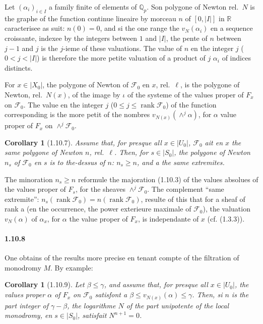 \documentclass[12pt,a4paper]{article}
\theoremstyle{plain}
\newtheorem{corollary}[theorem]{Corollary}
\theoremstyle{definition}
\theoremstyle{remark}
\DeclareMathOperator{\rank}{rank}
\newcommand{\QQ}{{\mathbb{Q}}}
\newcommand{\RR}{{\mathbb{R}}}
\begin{document}
Let $(\alpha_i)_{i \in I}$ a family finite of elements of $\QQ_p$. Son polygone of Newton rel.~$N$ is the graphe of the function continue lineaire by morceau $n$ of $[0, |I|]$ in $\RR$ caracterisee as suit: $n(0) = 0$, and si the one range the $v_N(\alpha_i)$ en a sequence croissante, indexee by the integers between $1$ and $|I|$, the pente of $n$ between $j-1$ and $j$ is the $j$-ieme of these valuations. The value of $n$ en the integer $j$ ($0 < j < |I|$) is therefore the more petite valuation of a product of $j$ $\alpha_i$ of indices distincts.

For $x \in |X_0|$, the polygone of Newton of $\mathscr{F}_0$ en $x$, rel.~$\ell$, is the polygone of Newton, rel.~$N(x)$, of the image by $\iota$ of the systeme of the values proper of $F_x$ on $\mathscr{F}_0$. The value en the integer $j$ ($0 \leq j \leq \rank \mathscr{F}_0$) of the function corresponding is the more petit of the nombres $v_{N(x)}(\wedge^j \alpha)$, for $\alpha$ value proper of $F_x$ on $\wedge^j \mathscr{F}_0$.


\begin{corollary}[1.10.7]
Assume that, for presque all $x \in |U_0|$, $\mathscr{F}_0$ ait en $x$ the same polygone of Newton $n$, rel.~$\ell$. Then, for $s \in |S_0|$, the polygone of Newton $n_s$ of $\mathscr{F}_0$ en $s$ is to the-dessus of $n$: $n_s \geq n$, and a the same extremites.
\end{corollary}

The minoration $n_s \geq n$ reformule the majoration (1.10.3) of the values absolues of the values proper of $F_s$, for the sheaves $\wedge^j \mathscr{F}_0$. The complement ``same extremite'': $n_s(\rank \mathscr{F}_0) = n(\rank \mathscr{F}_0)$, resulte of this that for a sheaf of rank a (en the occurrence, the power exterieure maximale of $\mathscr{F}_0$), the valuation $v_N(\alpha)$ of $\alpha_x$, for $\alpha$ the value proper of $F_x$, is independante of $x$ (cf. (1.3.3)).

\paragraph{1.10.8}
One obtains of the results more precise en tenant compte of the filtration of monodromy $M$. By example:


\begin{corollary}[1.10.9]
Let $\beta \leq \gamma$, and assume that, for presque all $x \in |U_0|$, the values proper $\alpha$ of $F_x$ on $\mathscr{F}_0$ satisfont a $\beta \leq v_{N(x)}(\alpha) \leq \gamma$. Then, si $n$ is the part integer of $\gamma - \beta$, the logarithme $N$ of the part unipotente of the local monodromy, en $s \in |S_0|$, satisfait $N^{n+1} = 0$.
\end{corollary}
\end{document}
